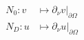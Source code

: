 \documentclass[10pt,xcolor={dvipsnames}]{beamer}
\theoremstyle{plain}
\theoremstyle{plain}
\begin{document}
\begin{frame}[t]
{\begin{columns}
\begin{column}{0.5\textwidth}
   \end{column}
   \begin{column}{0.5\textwidth}
   \vspace{0.6cm}
  \[
\begin{aligned}
 N_0: %
 v&\mapsto \partial_\nu v|_{\partial\Omega}\\
 N_D: %
 u&\mapsto \partial_\nu u|_{\partial\Omega}
\end{aligned}
\]
  \end{column}
  \end{columns}
}
\end{frame}
\end{document}
